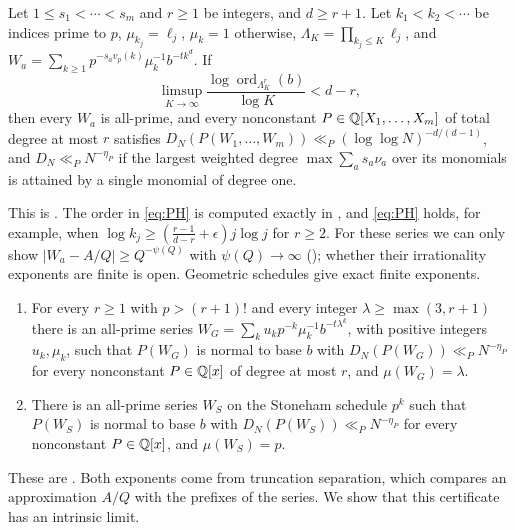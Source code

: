 \documentclass[11pt]{article}
\DeclareMathOperator{\ord}{ord}
\begin{document}
\begin{maintheorem}\label{thm:B}
Let $1\le s_1<\cdots<s_m$ and $r\ge1$ be integers, and $d\ge r+1$. Let $k_1<k_2<\cdots$ be indices prime to $p$,
$\mu_{k_j}=\ell_j$, $\mu_k=1$ otherwise, $\Lambda_K=\prod_{k_j\le K}\ell_j$, and
$W_a=\sum_{k\ge1}p^{-s_av_p(k)}\mu_k^{-1}b^{-tk^d}$. If
\begin{equation}\label{eq:PH}
\limsup_{K\to\infty}\frac{\log\ord_{\Lambda_K^r}(b)}{\log K}<d-r,
\end{equation}
then every $W_a$ is all-prime, and every nonconstant $P\in\mathbb Q[X_1,\ldots,X_m]$ of total degree at most $r$ satisfies
$D_N(P(W_1,\ldots,W_m))\ll_P(\log\log N)^{-d/(d-1)}$, and $D_N\ll_PN^{-\eta_P}$ if the largest weighted degree
$\max\sum_as_a\nu_a$ over its monomials is attained by a single monomial of degree one.
\end{maintheorem}

This is . The order in \eqref{eq:PH} is computed exactly in , and
\eqref{eq:PH} holds, for example, when $\log k_j\ge(\frac{r-1}{d-r}+\epsilon)j\log j$ for $r\ge2$. For these series we
can only show $|W_a-A/Q|\ge Q^{-\psi(Q)}$ with $\psi(Q)\to\infty$ (); whether their
irrationality exponents are finite is open. Geometric schedules give exact finite exponents.

\begin{maintheorem}\label{thm:C}
\begin{enumerate}[label=\textup{(\roman*)},nosep]
\item For every $r\ge1$ with $p>(r+1)!$ and every integer $\lambda\ge\max(3,r+1)$ there is an all-prime series
$W_G=\sum_ku_kp^{-k}\mu_k^{-1}b^{-t\lambda^k}$, with positive integers $u_k,\mu_k$, such that $P(W_G)$ is normal to
base $b$ with $D_N(P(W_G))\ll_PN^{-\eta_P}$ for every nonconstant $P\in\mathbb Q[x]$ of degree at most $r$, and
$\mu(W_G)=\lambda$.
\item There is an all-prime series $W_S$ on the Stoneham schedule $p^k$ such that $P(W_S)$ is normal to base $b$
with $D_N(P(W_S))\ll_PN^{-\eta_P}$ for every nonconstant $P\in\mathbb Q[x]$, and $\mu(W_S)=p$.
\end{enumerate}
\end{maintheorem}

These are . Both exponents come from truncation separation, which compares an
approximation $A/Q$ with the prefixes of the series. We show that this certificate has an intrinsic limit.
\end{document}
